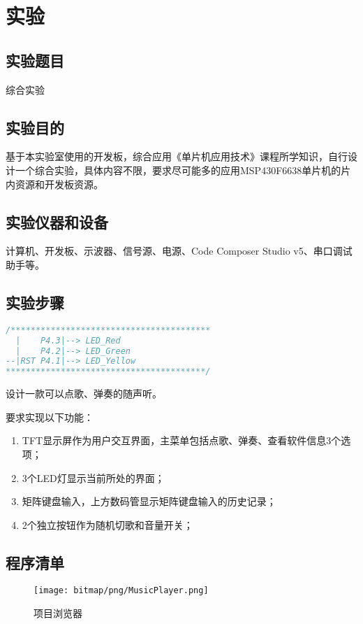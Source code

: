 ﻿%
\section{实验}
\subsection{实验题目}
综合实验
\subsection{实验目的}
基于本实验室使用的开发板，综合应用《单片机应用技术》课程所学知识，自行设计一个综合实验，具体内容不限，要求尽可能多的应用MSP430F6638单片机的片内资源和开发板资源。
\subsection{实验仪器和设备}
计算机、开发板、示波器、信号源、电源、Code Composer Studio v5、串口调试助手等。
\subsection{实验步骤}
\begin{lstlisting}[language=C]
/****************************************
  |    P4.3|--> LED_Red
  |    P4.2|--> LED_Green
--|RST P4.1|--> LED_Yellow
****************************************/
\end{lstlisting}
\par\indent 设计一款可以点歌、弹奏的随声听。
\par\indent 要求实现以下功能：
\begin{enumerate}
	\item TFT显示屏作为用户交互界面，主菜单包括点歌、弹奏、查看软件信息3个选项；
	\item 3个LED灯显示当前所处的界面；
	\item 矩阵键盘输入，上方数码管显示矩阵键盘输入的历史记录；
	\item 2个独立按钮作为随机切歌和音量开关；
\end{enumerate}
\subsection{程序清单}
\begin{figure}[htbp]
	\centering
	\caption{项目浏览器}
	\label{MusicPlayer}
	\texttt{[image: bitmap/png/MusicPlayer.png]}
\end{figure}

